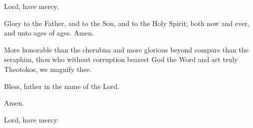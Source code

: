 {%
\begin{reader}
\item Lord, have mercy. 
\item Glory to the Father, and to the Son, and to the Holy Spirit;
  both now and ever, and unto ages of ages. Amen.
\item More honorable than the cherubim and more glorious beyond compare than
  the seraphim, thou who without corruption bearest God the Word and art truly
  Theotokos, we magnify thee.
\item Bless, father in the name of the Lord.
\end{reader}







\vbox{}


\begin{reader}
\item Amen.
\item Lord, have mercy. 
\end{reader}

}
